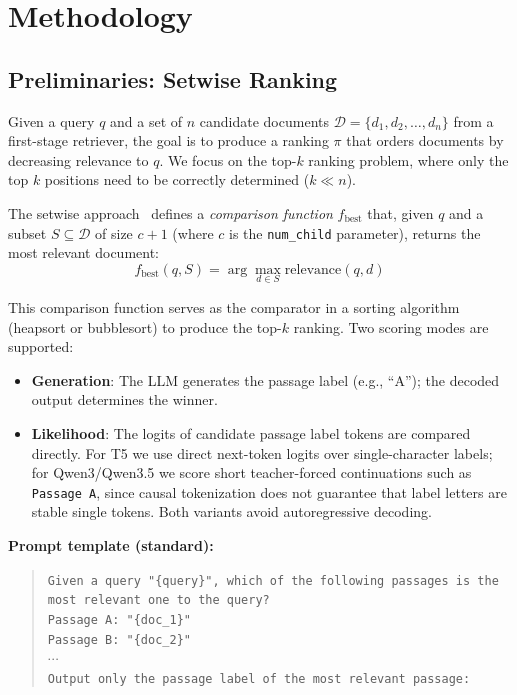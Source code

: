 \section{Methodology}
\label{sec:method}

\subsection{Preliminaries: Setwise Ranking}

Given a query $q$ and a set of $n$ candidate documents $\mathcal{D} = \{d_1, d_2, \ldots, d_n\}$ from a first-stage retriever, the goal is to produce a ranking $\pi$ that orders documents by decreasing relevance to $q$. We focus on the top-$k$ ranking problem, where only the top $k$ positions need to be correctly determined ($k \ll n$).

The setwise approach~\citep{zhuang2024setwise} defines a \emph{comparison function} $f_{\text{best}}$ that, given $q$ and a subset $S \subseteq \mathcal{D}$ of size $c+1$ (where $c$ is the \texttt{num\_child} parameter), returns the most relevant document:
\begin{equation}
f_{\text{best}}(q, S) = \arg\max_{d \in S} \text{relevance}(q, d)
\label{eq:fbest}
\end{equation}

This comparison function serves as the comparator in a sorting algorithm (heapsort or bubblesort) to produce the top-$k$ ranking. Two scoring modes are supported:
\begin{itemize}[leftmargin=*]
\item \textbf{Generation}: The LLM generates the passage label (e.g., ``A''); the decoded output determines the winner.
\item \textbf{Likelihood}: The logits of candidate passage label tokens are compared directly. For T5 we use direct next-token logits over single-character labels; for Qwen3/Qwen3.5 we score short teacher-forced continuations such as \texttt{Passage A}, since causal tokenization does not guarantee that label letters are stable single tokens. Both variants avoid autoregressive decoding.
\end{itemize}

\textbf{Prompt template (standard):}
\begin{quote}
\small\texttt{Given a query "\{query\}", which of the following passages is the most relevant one to the query?}\\
\texttt{Passage A: "\{doc\_1\}"}\\
\texttt{Passage B: "\{doc\_2\}"}\\
$\cdots$\\
\texttt{Output only the passage label of the most relevant passage:}
\end{quote}


